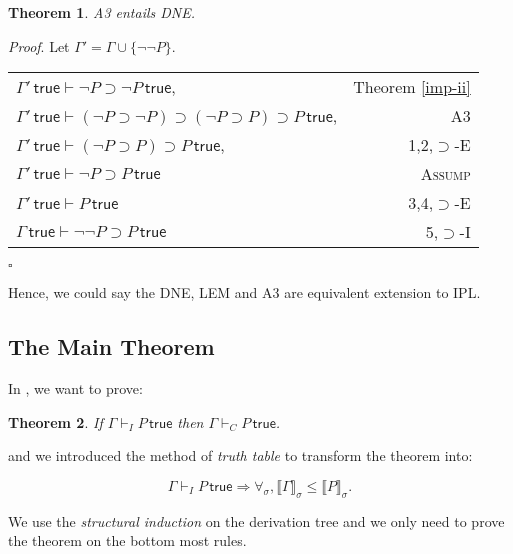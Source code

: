 \documentclass{article}
\newcounter{rowcount}
\newtheorem{theorem}{Theorem}[section]
\newenvironment{proof}{\emph{Proof}.}{\hfill$\square$}
\newcommand{\true}{\,\textsf{true}}
\newcommand{\brs}[1]{\llbracket#1\rrbracket_\sigma}
\begin{document}
\setcounter{rowcount}{0}
\begin{theorem}
    \emph{A3} entails \emph{DNE}.
\end{theorem}
\begin{proof}
    Let $\Gamma' = \Gamma \cup \{\neg\neg P\}$.

    \begin{tabular}{@{\stepcounter{rowcount}\therowcount. }lr}
        $\Gamma' \true \vdash \neg P \supset \neg P\true$,                                        & Theorem \ref{imp-ii} \\
        $\Gamma' \true \vdash (\neg P \supset \neg P) \supset (\neg P \supset P)\supset P\true $, & A3                   \\
        $\Gamma' \true \vdash (\neg P \supset P)\supset P\true $,                                 & 1,2,$\supset$-E      \\
        $\Gamma' \true \vdash \neg P\supset P \true$                                              & \textsc{Assump}      \\
        $\Gamma' \true \vdash P \true$                                                            & 3,4,$\supset$-E      \\
        $\Gamma \true \vdash \neg\neg P \supset P \true$                                          & 5,$\supset$-I        \\
    \end{tabular}
\end{proof}

Hence, we could say the DNE, LEM and A3 are equivalent extension to IPL.

\subsection{The Main Theorem}

In \cite{int}, we want to prove:

\begin{theorem}
    If $\Gamma \vdash_{I} P \true$ then $\Gamma \vdash_{C} P \true$.
\end{theorem}

and we introduced the method of \emph{truth table} to transform the theorem into:

\[
    \Gamma \vdash_{I} P \true \Rightarrow \forall_\sigma, \brs{\Gamma} \leq \brs{P}.
\]

We use the \emph{structural induction} on the derivation tree and we only need to prove the theorem on the bottom most rules.
\end{document}
